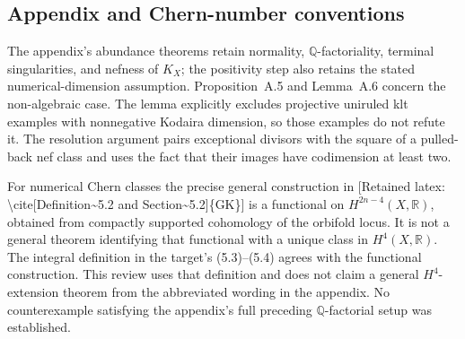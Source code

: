 \documentclass[10pt]{article}
\begin{document}
\subsection*{Appendix and Chern-number conventions}
The appendix’s abundance theorems retain normality, \(\mathbb Q\)-factoriality, terminal singularities, and nefness of \(K_X\); the positivity step also retains the stated numerical-dimension assumption. Proposition A.5 and Lemma A.6 concern the non-algebraic case. The lemma explicitly excludes projective uniruled klt examples with nonnegative Kodaira dimension, so those examples do not refute it. The resolution argument pairs exceptional divisors with the square of a pulled-back nef class and uses the fact that their images have codimension at least two.\par
For numerical Chern classes the precise general construction in [Retained latex: \textbackslash{}cite[Definition\textasciitilde{}5.2 and Section\textasciitilde{}5.2]\{GK\}] is a functional on \(H^{2n-4}(X,\mathbb R)\), obtained from compactly supported cohomology of the orbifold locus. It is not a general theorem identifying that functional with a unique class in \(H^4(X,\mathbb R)\). The integral definition in the target’s (5.3)–(5.4) agrees with the functional construction. This review uses that definition and does not claim a general \(H^4\)-extension theorem from the abbreviated wording in the appendix. No counterexample satisfying the appendix’s full preceding \(\mathbb Q\)-factorial setup was established.\par
\end{document}
